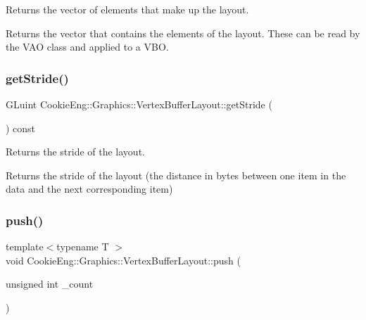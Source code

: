 Returns the vector of elements that make up the layout. 

Returns the vector that contains the elements of the layout. These can be read by the V\+AO class and applied to a V\+BO. \mbox{\label{class_cookie_eng_1_1_graphics_1_1_vertex_buffer_layout_a4c771d06898767d1a92237b03a53e887}} 
\subsubsection{\texorpdfstring{get\+Stride()}{getStride()}}
{\footnotesize\ttfamily G\+Luint Cookie\+Eng\+::\+Graphics\+::\+Vertex\+Buffer\+Layout\+::get\+Stride (\begin{DoxyParamCaption}{ }\end{DoxyParamCaption}) const\hspace{0.3cm}{\ttfamily [inline]}}



Returns the stride of the layout. 

Returns the stride of the layout (the distance in bytes between one item in the data and the next corresponding item) \mbox{\label{class_cookie_eng_1_1_graphics_1_1_vertex_buffer_layout_a8d9958c85411d75d7f412b2d3f7b566a}} 
\subsubsection{\texorpdfstring{push()}{push()}\hspace{0.1cm}{\footnotesize\ttfamily [1/4]}}
{\footnotesize\ttfamily template$<$typename T $>$ \\
void Cookie\+Eng\+::\+Graphics\+::\+Vertex\+Buffer\+Layout\+::push (\begin{DoxyParamCaption}\item[{unsigned int}]{\+\_\+count }\end{DoxyParamCaption})\hspace{0.3cm}{\ttfamily [inline]}}



